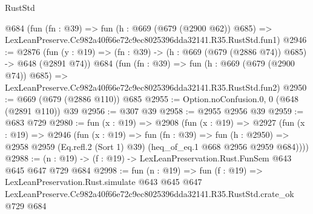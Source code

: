 \begin{lexlean}{RustStd}
\begin{coremodule}
    @684
    (fun (fn : @39) =>
    fun (h : @669 (@679 (@2900 @62)) @685) =>
    LexLeanPreserve.Cc982a40f66e72c9ec8025396dda32141.R35.RustStd.fun1)
@2946 := @2876
    (fun (y : @19) => (fn : @39) -> (h : @669 (@679 (@2886 @74)) @685) -> @648 (@2891 @74))
    @684
    (fun (fn : @39) =>
    fun (h : @669 (@679 (@2900 @74)) @685) =>
    LexLeanPreserve.Cc982a40f66e72c9ec8025396dda32141.R35.RustStd.fun2)
@2950 := @669 (@679 (@2886 @110)) @685
@2955 := Option.noConfusion.{0, 0} (@648 (@2891 @110)) @39
@2956 := @307 @39
@2958 := @2955 @2956 @39
@2959 := @683 @729
@2980 := fun (x : @19) =>
  @2908
    (fun (x : @19) =>
    @2927
      (fun (x : @19) =>
      @2946
        (fun (x : @19) =>
        fun (fn : @39) =>
        fun (h : @2950) =>
        @2958 @2959 (Eq.refl.{2} (Sort 1) @39) (heq_of_eq.{1} @668 @2956 @2959 @684))))
@2988 := (n : @19) -> (f : @19) -> LexLeanPreservation.Rust.FunSem @643 @645 @647 @729 @684
@2998 := fun (n : @19) =>
  fun (f : @19) =>
  LexLeanPreservation.Rust.simulate
    @643
    @645
    @647
    LexLeanPreserve.Cc982a40f66e72c9ec8025396dda32141.R35.RustStd.crate_ok
    @729
    @684
\end{coremodule}
\end{lexlean}
